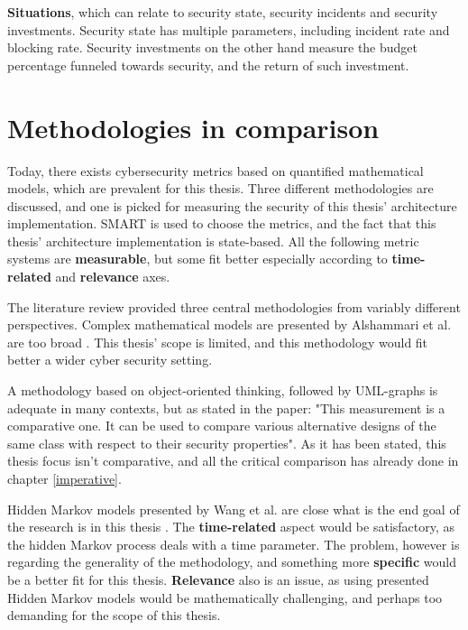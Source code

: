 \textbf{Situations}, which can relate to security state, security incidents and security investments. Security state has multiple parameters, including incident rate and blocking rate. Security investments on the other hand measure the budget percentage funneled towards security, and the return of such investment. \cite{pendleton2016survey}

\section{Methodologies in comparison} \label{whyqueries}

Today, there exists cybersecurity metrics based on quantified mathematical models, which are prevalent for this thesis. Three different methodologies are discussed, and one is picked for measuring the security of this thesis' architecture implementation. SMART is used to choose the metrics, and the fact that this thesis' architecture implementation is state-based. All the following metric systems are \textbf{measurable}, but some fit better especially according to \textbf{time-related} and \textbf{relevance} axes. 

The literature review provided three central methodologies from variably different perspectives. Complex mathematical models are presented by Alshammari et al. are too broad \cite{alshammari2009security}. This thesis' scope is limited, and this methodology would fit better a wider cyber security setting. 

A methodology based on object-oriented thinking, followed by UML-graphs is adequate in many contexts, but as stated in the paper: "This measurement is a
comparative one. It can be used to compare various
alternative designs of the same class with respect to
their security properties". As it has been stated, this thesis focus isn't comparative, and all the critical comparison has already done in chapter \ref{imperative}. 

Hidden Markov models presented by Wang et al. are close what is the end goal of the research is in this thesis \cite{wang2010framework}. The \textbf{time-related} aspect would be satisfactory, as the hidden Markov process deals with a time parameter. The problem, however is regarding the generality of the methodology, and something more \textbf{specific} would be a better fit for this thesis. \textbf{Relevance} also is an issue, as using presented Hidden Markov models would be mathematically challenging, and perhaps too demanding for the scope of this thesis. 

